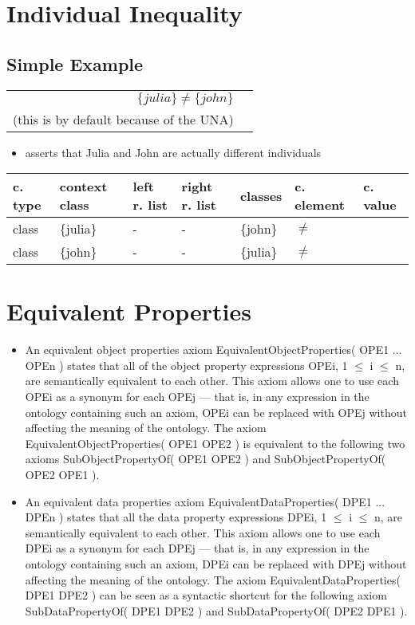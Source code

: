 \documentclass{llncs}
\newenvironment{gcotable}{
  \scriptsize
  \sffamily
  \vspace{0.3cm}
	\begin{center}
  \begin{tabular}{l|l|l|l|l|l|l}
  \hline
  \textbf{c. type} & \textbf{context class} & \textbf{left r. list} & \textbf{right r. list} & \textbf{classes} & \textbf{c. element} & \textbf{c. value} \\
  \hline

}{
  \hline
  \end{tabular}
	\end{center}
}
\newenvironment{DL}{
	\begin{center}
  \begin{tabular}{r l}

}{
  \end{tabular}
	\end{center}
}
\begin{document}
\section{Individual Inequality}



\subsection{Simple Example}

\begin{DL}
$\{julia\} \ne \{john\} $\\
(this is by default because of the UNA)
\end{DL}

\begin{itemize}
	\item asserts that Julia and John are actually different individuals
\end{itemize}

\begin{gcotable}
class & \{julia\} & - & - & \{john\} & $\ne$ \\
class & \{john\} & - & - & \{julia\} & $\ne$ \\
\end{gcotable}

\section{Equivalent Properties}



\begin{itemize}
	\item An equivalent object properties axiom EquivalentObjectProperties( OPE1 ... OPEn ) states that all of the object property expressions OPEi, 1 $\leq$ i $\leq$ n, are semantically equivalent to each other. This axiom allows one to use each OPEi as a synonym for each OPEj — that is, in any expression in the ontology containing such an axiom, OPEi can be replaced with OPEj without affecting the meaning of the ontology. The axiom EquivalentObjectProperties( OPE1 OPE2 ) is equivalent to the following two axioms SubObjectPropertyOf( OPE1 OPE2 ) and SubObjectPropertyOf( OPE2 OPE1 ).
	\item An equivalent data properties axiom EquivalentDataProperties( DPE1 ... DPEn ) states that all the data property expressions DPEi, 1 $\leq$ i $\leq$ n, are semantically equivalent to each other. This axiom allows one to use each DPEi as a synonym for each DPEj — that is, in any expression in the ontology containing such an axiom, DPEi can be replaced with DPEj without affecting the meaning of the ontology. The axiom EquivalentDataProperties( DPE1 DPE2 ) can be seen as a syntactic shortcut for the following axiom SubDataPropertyOf( DPE1 DPE2 ) and SubDataPropertyOf( DPE2 DPE1 ).

\end{itemize}
\end{document}
